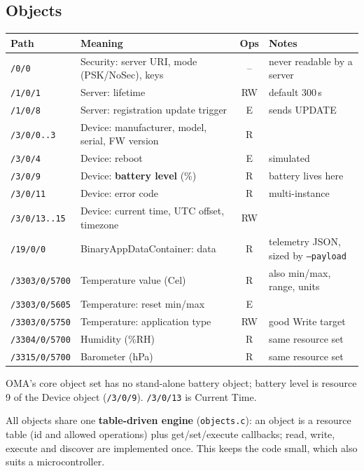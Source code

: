 \documentclass[11pt,a4paper]{article}
\newcommand{\code}[1]{\texttt{#1}}
\begin{document}
\subsection{Objects}
\begin{longtable}{@{}lp{6.2cm}cp{4.3cm}@{}}
\toprule
Path & Meaning & Ops & Notes \\
\midrule
\endhead
\code{/0/0} & Security: server URI, mode (PSK/NoSec), keys & -- & never readable by a server \\
\code{/1/0/1} & Server: lifetime & RW & default 300\,s \\
\code{/1/0/8} & Server: registration update trigger & E & sends UPDATE \\
\code{/3/0/0..3} & Device: manufacturer, model, serial, FW version & R & \\
\code{/3/0/4} & Device: reboot & E & simulated \\
\code{/3/0/9} & Device: \textbf{battery level} (\%) & R & battery lives here \\
\code{/3/0/11} & Device: error code & R & multi-instance \\
\code{/3/0/13..15} & Device: current time, UTC offset, timezone & RW & \\
\code{/19/0/0} & BinaryAppDataContainer: data & R & telemetry JSON, sized by \code{--payload} \\
\code{/3303/0/5700} & Temperature value (Cel) & R & also min/max, range, units \\
\code{/3303/0/5605} & Temperature: reset min/max & E & \\
\code{/3303/0/5750} & Temperature: application type & RW & good Write target \\
\code{/3304/0/5700} & Humidity (\%RH) & R & same resource set \\
\code{/3315/0/5700} & Barometer (hPa) & R & same resource set \\
\bottomrule
\end{longtable}
OMA's core object set has no stand-alone battery object; battery level is
resource 9 of the Device object (\code{/3/0/9}). \code{/3/0/13} is Current Time.

All objects share one \textbf{table-driven engine} (\code{objects.c}): an object
is a resource table (id and allowed operations) plus get/set/execute
callbacks; read, write, execute and discover are implemented once. This keeps
the code small, which also suits a microcontroller.
\end{document}

